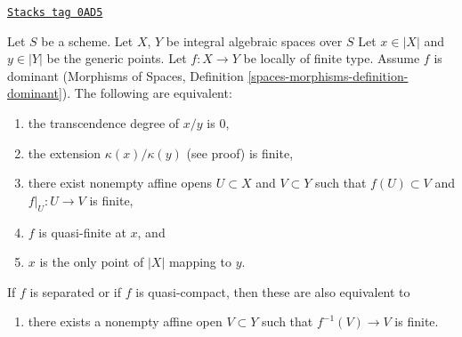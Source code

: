 \begin{lemma}
\label{spaces-over-fields-lemma-finite-degree}
\href{https://stacks.math.columbia.edu/tag/0AD5}{\texttt{Stacks tag 0AD5}}

Let $S$ be a scheme. Let $X$, $Y$ be integral algebraic spaces over $S$
Let $x \in |X|$ and $y \in |Y|$ be the generic points. Let $f : X \to Y$
be locally of finite type. Assume $f$ is dominant
(Morphisms of Spaces, Definition \ref{spaces-morphisms-definition-dominant}).
The following are equivalent:
\begin{enumerate}
\item the transcendence degree of $x/y$ is $0$,
\item the extension $\kappa(x)/\kappa(y)$ (see proof) is finite,
\item there exist nonempty affine opens $U \subset X$ and $V \subset Y$
such that $f(U) \subset V$ and $f|_U : U \to V$ is finite,
\item $f$ is quasi-finite at $x$, and
\item $x$ is the only point of $|X|$ mapping to $y$.
\end{enumerate}
If $f$ is separated or if $f$ is quasi-compact, then these are
also equivalent to
\begin{enumerate}
\item[(6)] there exists a nonempty affine open $V \subset Y$ such
that $f^{-1}(V) \to V$ is finite.
\end{enumerate}
\end{lemma}

